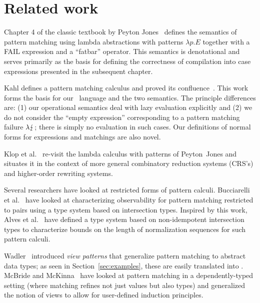 
\section{Related work}\label{sec:related}

Chapter 4 of the classic textbook by Peyton Jones~\cite{spj_1987}
defines the semantics of pattern matching using lambda abstractions
with patterns $\lambda p.E$ together with a \textsf{FAIL} expression
and a ``fatbar'' operator. This semantics is
denotational and serves primarily as the basis for defining the
correctness of compilation into case expressions presented in
the subsequent chapter.

Kahl defines a pattern matching calculus and proved its
confluence~\cite{kahl_2004}. This work forms the basis for our
\lambdaPMC\ language and the two semantics. The principle differences
are: (1) our operational semantics deal with lazy evaluation
explicitly and (2) we do not consider the ``empty expression'' corresponding to a
pattern matching failure $\lambda\lightning$; there is simply no
evaluation in such cases.  Our definitions of normal forms for expressions
and matchings are also novel. %

Klop et al.\@~\cite{KLOP200816} re-visit the lambda calculus with
patterns of Peyton~Jones and situates it in the context of more
general combinatory reduction systems (CRS's) and higher-order
rewriting systems.

Several researchers have looked at restricted forms of pattern
calculi.  Bucciarelli et al.\@~\cite{bucciarelli_et_al_2015} have
looked at characterizing observability for pattern matching restricted
to pairs using a type system based on intersection types.  Inspired by
this work, Alves et al.\@~\cite{alves_et_al_2020} have defined a
type system based on non-idempotent intersection types to characterize
bounds on the length of normalization sequences for such pattern
calculi.

Wadler~\cite{wadler_1987} introduced \emph{view patterns} that
generalize pattern matching to abstract data types; as seen in Section~\ref{sec:examples},
these are easily translated into \lambdaPMC.
McBride and McKinna~\cite{mcbride_mckinna_2004} have looked at pattern
matching in a dependently-typed setting (where matching refines not
just values but also types) and generalized the notion of views to
allow for  user-defined induction principles.  




